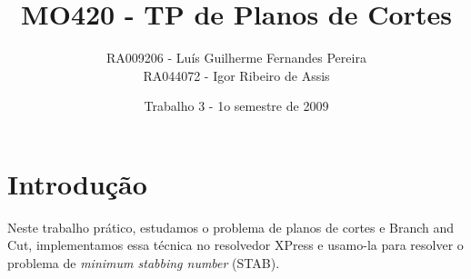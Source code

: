 \documentclass[11pt]{article}
\title{MO420 - TP de Planos de Cortes}
\author{RA009206 - Luís Guilherme Fernandes Pereira \\
RA044072 - Igor Ribeiro de Assis}
\date{Trabalho 3 - 1o semestre de 2009}
\begin{document}
\maketitle

\section{Introdução}

Neste trabalho prático, estudamos o problema de planos de cortes e
Branch and Cut, implementamos essa técnica no resolvedor XPress e
usamo-la para resolver o problema de \emph{minimum stabbing number}
(STAB).  
\end{document}
